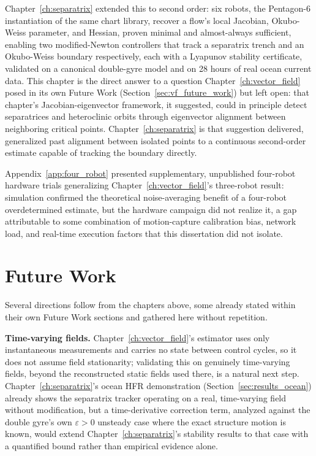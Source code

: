 \documentclass[12pt, letterpaper, oneside]{report}
\begin{document}
Chapter~\ref{ch:separatrix} extended this to second order: six robots,
the Pentagon-6 instantiation of the same chart library, recover a
flow's local Jacobian, Okubo-Weiss parameter, and Hessian, proven
minimal and almost-always sufficient, enabling two modified-Newton
controllers that track a separatrix trench and an Okubo-Weiss boundary
respectively, each with a Lyapunov stability certificate, validated on a
canonical double-gyre model and on 28 hours of real ocean current data.
This chapter is the direct answer to a question Chapter~\ref{ch:vector_field}
posed in its own Future Work (Section~\ref{sec:vf_future_work}) but
left open: that chapter's Jacobian-eigenvector framework, it suggested,
could in principle detect separatrices and heteroclinic orbits through
eigenvector alignment between neighboring critical points.
Chapter~\ref{ch:separatrix} is that suggestion delivered, generalized
past alignment between isolated points to a continuous second-order
estimate capable of tracking the boundary directly.

Appendix~\ref{app:four_robot} presented supplementary, unpublished
four-robot hardware trials generalizing Chapter~\ref{ch:vector_field}'s
three-robot result: simulation confirmed the theoretical noise-averaging
benefit of a four-robot overdetermined estimate, but the hardware
campaign did not realize it, a gap attributable to some combination of
motion-capture calibration bias, network load, and real-time execution
factors that this dissertation did not isolate.

\section{Future Work}

Several directions follow from the chapters above, some already stated
within their own Future Work sections and gathered here without
repetition.

\textbf{Time-varying fields.} Chapter~\ref{ch:vector_field}'s estimator
uses only instantaneous measurements and carries no state between
control cycles, so it does not assume field stationarity; validating
this on genuinely time-varying fields, beyond the reconstructed static
fields used there, is a natural next step.
Chapter~\ref{ch:separatrix}'s ocean HFR demonstration
(Section~\ref{sec:results_ocean}) already shows the separatrix tracker
operating on a real, time-varying field without modification, but a
time-derivative correction term, analyzed against the double gyre's
own $\varepsilon>0$ unsteady case where the exact structure motion is
known, would extend Chapter~\ref{ch:separatrix}'s stability results to
that case with a quantified bound rather than empirical evidence alone.
\end{document}
